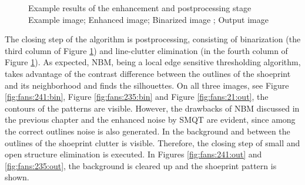 \documentclass[draft,final]{vutinfth} %
\begin{document}
{\begin{figure}[H]

\caption{Example results of the enhancement and postprocessing stage
				 Example image;  Enhanced image;  Binarized image ;  Output image}
\label{fig:fans:enhance}

\end{figure}
}
\par
The closing step of the algorithm is postprocessing, consisting of binarization (the third column of Figure \ref{fig:fans:enhance}) and line-clutter elimination (in the fourth column of Figure \ref{fig:fans:enhance}).
As expected, NBM, being a local edge sensitive thresholding algorithm, takes advantage of the contrast difference between the outlines of the shoeprint and its neighborhood and finds the silhouettes. 
On all three images, see Figure \ref{fig:fans:241:bin}, Figure \ref{fig:fans:235:bin} and Figure \ref{fig:fans:21:out}, the contours of the patterns are visible.
However, the drawbacks of NBM discussed in the previous chapter and the enhanced noise by SMQT are evident, since among the correct outlines noise is also generated.
In the background and between the outlines of the shoeprint clutter is visible.
Therefore, the closing step of small and open structure elimination is executed.
In Figures \ref{fig:fans:241:out} and \ref{fig:fans:235:out}, the background is cleared up and the shoeprint pattern is shown.
\end{document}
